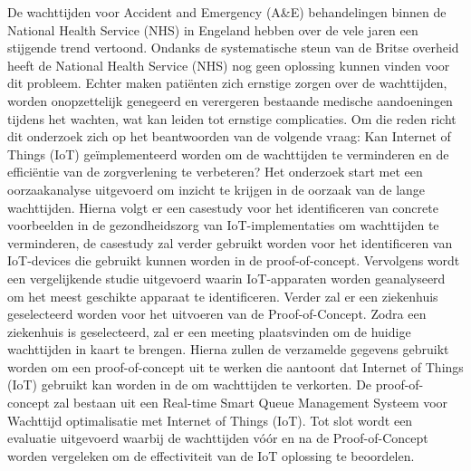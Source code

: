 De wachttijden voor Accident and Emergency (A&E) behandelingen binnen de National Health Service (NHS)
in Engeland hebben over de vele jaren een stijgende trend vertoond. Ondanks de systematische steun van de
Britse overheid heeft de National Health Service (NHS) nog geen oplossing kunnen vinden voor dit probleem.
Echter maken patiënten zich ernstige zorgen over de wachttijden, worden onopzettelijk genegeerd en verergeren
bestaande medische aandoeningen tijdens het wachten, wat kan leiden tot ernstige complicaties. Om die
reden richt dit onderzoek zich op het beantwoorden van de volgende vraag: Kan Internet of Things (IoT) geïmplementeerd
worden om de wachttijden te verminderen en de efficiëntie van de zorgverlening te verbeteren?
Het onderzoek start met een oorzaakanalyse uitgevoerd om inzicht te krijgen in de oorzaak van de lange wachttijden.
Hierna volgt er een casestudy voor het identificeren van concrete voorbeelden in de gezondheidszorg van
IoT-implementaties om wachttijden te verminderen, de casestudy zal verder gebruikt worden voor het identificeren
van IoT-devices die gebruikt kunnen worden in de proof-of-concept. Vervolgens wordt een vergelijkende
studie uitgevoerd waarin IoT-apparaten worden geanalyseerd om het meest geschikte apparaat te identificeren.
Verder zal er een ziekenhuis geselecteerd worden voor het uitvoeren van de Proof-of-Concept. Zodra een ziekenhuis
is geselecteerd, zal er een meeting plaatsvinden om de huidige wachttijden in kaart te brengen. Hierna
zullen de verzamelde gegevens gebruikt worden om een proof-of-concept uit te werken die aantoont dat Internet
of Things (IoT) gebruikt kan worden in de om wachttijden te verkorten. De proof-of-concept zal bestaan uit
een Real-time Smart Queue Management Systeem voor Wachttijd optimalisatie met Internet of Things (IoT). Tot
slot wordt een evaluatie uitgevoerd waarbij de wachttijden vóór en na de Proof-of-Concept worden vergeleken
om de effectiviteit van de IoT oplossing te beoordelen.
